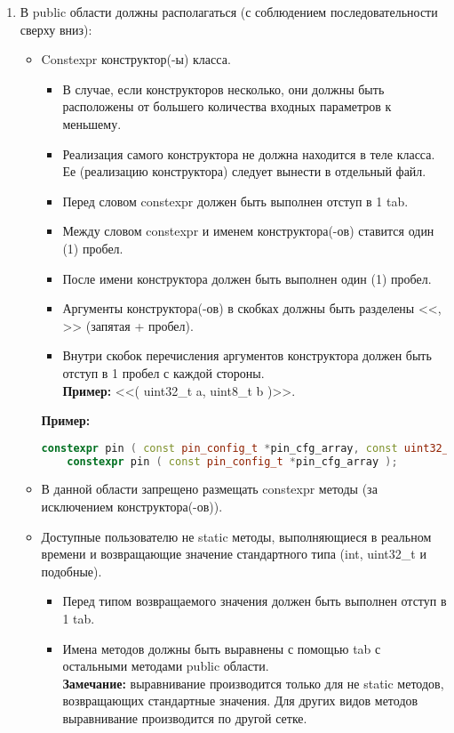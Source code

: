 \begin{enumerate}
	\item В public области должны располагаться (с соблюдением последовательности сверху вниз):
	\begin{itemize}
		\item Constexpr конструктор(-ы) класса.
		\begin{itemize}
			\item В случае, если конструкторов несколько, они должны быть расположены от большего количества входных параметров к меньшему.
			\item Реализация самого конструктора не должна находится в теле класса. Ее (реализацию конструктора) следует вынести в отдельный файл.
			\item Перед словом constexpr должен быть выполнен отступ в 1 tab.	
			\item Между словом constexpr и именем конструктора(-ов) ставится один (1) пробел.
			\item После имени конструктора должен быть выполнен один (1) пробел. 
			\item Аргументы конструктора(-ов) в скобках должны быть разделены <<, >> (запятая + пробел).
			\item Внутри скобок перечисления аргументов конструктора должен быть отступ в 1 пробел с каждой стороны.\\\textbf{Пример: } <<( uint32\_t a, uint8\_t b )>>.
		\end{itemize}
		\textbf{Пример:}
		\begin{lstlisting}[language=C++, frame=tlBR, basicstyle=\fontsize{8}{8}\ttfamily]
	constexpr pin ( const pin_config_t *pin_cfg_array, const uint32_t pin_cout );
	constexpr pin ( const pin_config_t *pin_cfg_array );
		\end{lstlisting}
		\item В данной области запрещено размещать constexpr методы (за исключением кон\-струк\-то\-ра\-(-ов)).
		\item Доступные пользователю не static методы, выполняющиеся в реальном времени и возвращающие значение стандартного типа (int, uint32\_t и подобные).
		\begin{itemize}
			\item Перед типом возвращаемого значения должен быть выполнен отступ в 1 tab.
			\item Имена методов должны быть выравнены с помощью tab с остальными методами public области.\\\textbf{Замечание: }выравнивание производится только для не static методов, возвращающих стандартные значения. Для других видов методов выравнивание производится по другой сетке.

\end{itemize}
\end{itemize}
\end{enumerate}
